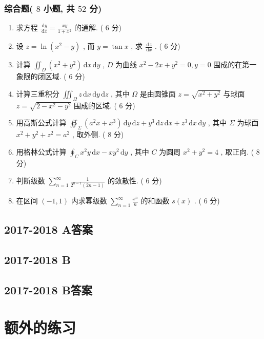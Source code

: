 \documentclass[cn,11pt,fancy,hide]{elegantbook}
\newcommand{\dd}{\,\mathrm{d}}
\begin{document}
\subsubsection{综合题( $8$ 小题, 共 $52$ 分)}
\begin{enumerate}
	\item 求方程 $\frac{\dd y}{\dd x}=\frac{x y}{1+x^{2}}$ 的通解. ( $6$ 分)
	
	\item 设 $z=\ln \left(x^{2}-y\right)$ , 而 $y=\tan x$ , 求 $\frac{\dd z}{\dd x}$ . ( $6$ 分)
	
	\item 计算 $\iint_{D}\left(x^{2}+y^{2}\right) \dd x \dd y$ , $D$ 为曲线 $x^{2}-2 x+y^{2}=0, y=0$ 围成的在第一象限的闭区域. ( $6$ 分)
	
	\item 计算三重积分 $\iiint_{\Omega} z \dd x \dd y \dd z$ , 其中 $\Omega$ 是由圆锥面 $z=\sqrt{x^{2}+y^{2}}$ 与球面 $z=\sqrt{2-x^{2}-y^{2}}$ 围成的区域. ( $6$ 分)
	
	\item 用高斯公式计算 $\oiint_{\Sigma}\left(a^{2} x+x^{3}\right) \dd y \dd z+y^{3} \dd z \dd x+z^{3} \dd x \dd y$ , 其中 $\Sigma$ 为球面 $x^{2}+y^{2}+z^{2}=a^{2}$ , 取外侧. ( $8$ 分)
	
	\item 用格林公式计算 $\oint_{C} x^{2} y \dd x-x y^{2} \dd y$ , 其中 $C$ 为圆周 $x^2+y^2=4$ , 取正向. ( $8$ 分)
	
	\item 判断级数 $\sum_{n=1}^{\infty} \frac{1}{2^{n-1}(2 n-1)}$ 的敛散性. ( $6$ 分)
	
	\item 在区间 $(-1,1)$ 内求幂级数 $\sum_{n=1}^{\infty} \frac{x^{n}}{n}$ 的和函数 $s(x)$ . ( $6$ 分)
\end{enumerate}


\subsection{2017-2018 A答案}
\subsection{2017-2018 B}
\subsection{2017-2018 B答案}

\section{额外的练习}
\end{document}
